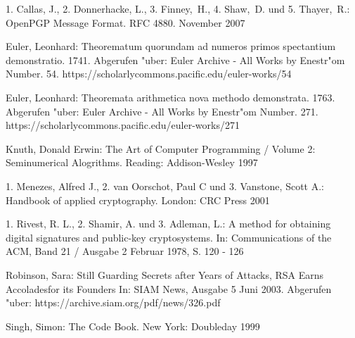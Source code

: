 \begin{thebibliography}{9}

1. Callas, J., 2. Donnerhacke, L., 3. Finney,~H., 4. Shaw,~D. und 5. Thayer,~R.:
OpenPGP Message Format. RFC 4880. November 2007

\piicitations

Euler, Leonhard: Theorematum quorundam ad numeros primos spectantium demonstratio.
1741. Abgerufen "uber: Euler Archive - All Works by Enestr"om Number. 54.
https://scholarlycommons.pacific.edu/euler-works/54

Euler, Leonhard: Theoremata arithmetica nova methodo demonstrata.
1763. Abgerufen "uber: Euler Archive - All Works by Enestr"om Number. 271.
https://scholarlycommons.pacific.edu/euler-works/271

Knuth, Donald Erwin: The Art of Computer Programming / Volume 2: Seminumerical Alogrithms.
Reading: Addison-Wesley 1997

1. Menezes, Alfred J., 2. van Oorschot, Paul C und 3. Vanstone, Scott A.:
Handbook of applied cryptography.
London: CRC Press 2001

1. Rivest, R. L., 2. Shamir, A. und 3. Adleman, L.:
A method for obtaining digital signatures and public-key cryptosystems.
In: Communications of the ACM, Band 21 / Ausgabe 2 Februar 1978, S. 120 - 126

Robinson, Sara: Still Guarding Secrets after Years of Attacks, RSA Earns Accoladesfor its Founders
In: SIAM News, Ausgabe 5 Juni 2003.
Abgerufen "uber: https://archive.siam.org/pdf/news/326.pdf

Singh, Simon: The Code Book. New York: Doubleday 1999

\end{thebibliography}
